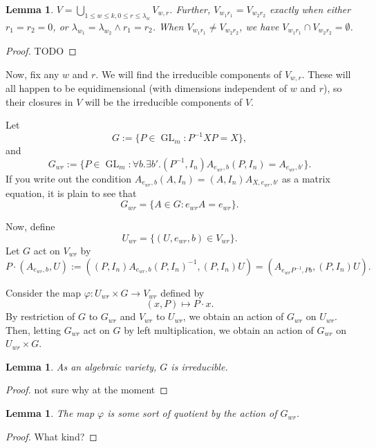 \documentclass[12pt,psamsfonts]{article}
\DeclareMathOperator{\GL}{GL}
\newtheorem{lemma}[theorem]{Lemma}
\begin{document}
\begin{lemma}
    \(V = \bigcup_{1 \leq w \leq k, 0 \leq r \leq \lambda_{w}} V_{w,r}\).
    Further, \(V_{w_1r_1} = V_{w_2r_2}\) exactly when either \(r_1 = r_2 = 0\), or \(\lambda_{w_1} = \lambda_{w_2} \land r_1 = r_2\).
    When \(V_{w_1r_1} \neq V_{w_2r_2}\), we have \(V_{w_1r_1} \cap V_{w_2r_2} = \emptyset\).
\end{lemma}
\begin{proof}
    TODO
\end{proof}
Now, fix any \(w\) and \(r\).
We will find the irreducible components of \(V_{w,r}\).
These will all happen to be equidimensional (with dimensions independent of \(w\) and \(r\)), so their closures in \(V\) will be the irreducible components of \(V\).
\par Let 
\[G := \{P \in \GL_m : P^{-1} X P = X\},\]
and
\[G_{wr} := \{P \in \GL_m : \forall b. \exists b'. (P^{-1}, I_n) A_{e_{wr}, b} (P, I_n) = A_{e_{wr}, b'}\}.\]
If you write out the condition \(A_{e_{wr}, b} (A, I_n) = (A, I_n) A_{X, e_{wr}, b'}\) as a matrix equation, it is plain to see that 
\[G_{wr} = \{A \in G : e_{wr}A = e_{wr}\}.\]
\par Now, define 
\[U_{wr} = \{(U, e_{wr}, b) \in V_{wr}\}.\]
Let \(G\) act on \(V_{wr}\) by
\[P \cdot (A_{e_{wr},b}, U) := ((P, I_n) A_{e_{wr}, b} (P, I_n)^{-1}, (P, I_n)U) = (A_{e_{wr} P^{-1}, Pb}, (P, I_n) U).\]
\par Consider the map \(\varphi : U_{wr} \times G \to V_{wr}\) defined by
\[(x, P) \mapsto P \cdot x.\]
By restriction of \(G\) to \(G_{wr}\) and \(V_{wr}\) to \(U_{wr}\), we obtain an action of \(G_{wr}\) on \(U_{wr}\).
Then, letting \(G_{wr}\) act on \(G\) by left multiplication, we obtain an action of \(G_{wr}\) on \(U_{wr} \times G\).
\begin{lemma}
    As an algebraic variety, \(G\) is irreducible.
\end{lemma}
\begin{proof}
    not sure why at the moment
\end{proof}
\begin{lemma}
    The map \(\varphi\) is some sort of quotient by the action of \(G_{wr}\).
\end{lemma}
\begin{proof}
    What kind?
\end{proof}
\end{document}
